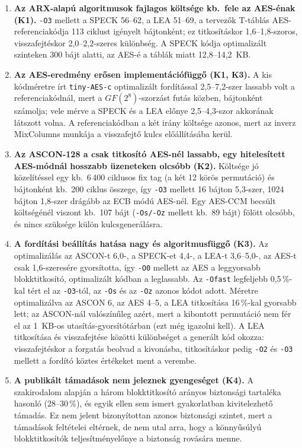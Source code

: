 \documentclass[a4paper,12pt]{report}
\theoremstyle{definition}
\theoremstyle{remark}
\begin{document}
\begin{enumerate}
\item \textbf{Az ARX-alapú algoritmusok fajlagos költsége kb.\ fele az AES-énak (K1).} \texttt{-O3} mellett a SPECK 56--62, a LEA 51--69, a tervezők T-táblás AES-referenciakódja 113 ciklust igényelt bájtonként; ez titkosításkor 1,6--1,8-szoros, visszafejtéskor 2,0--2,2-szeres különbség. A SPECK kódja optimalizált szinteken 300 bájt alatti, az AES-é a táblák miatt 12,8--14,2~KB.

\item \textbf{Az AES-eredmény erősen implementációfüggő (K1, K3).} A kis kódméretre írt \texttt{tiny-AES-c} optimalizált fordítással 2,5--7,2-szer lassabb volt a referenciakódnál, mert a $GF(2^8)$-szorzást futás közben, bájtonként számolja; vele mérve a SPECK és a LEA előnye 2,5--4,3-szor akkorának látszott volna. A referenciakódban a két irány költsége azonos, mert az inverz MixColumns munkája a visszafejtő kulcs előállításába kerül.

\item \textbf{Az ASCON-128 a csak titkosító AES-nél lassabb, egy hitelesített AES-módnál hosszabb üzeneteken olcsóbb (K2).} Költsége jó közelítéssel egy kb.\ 6\,400 ciklusos fix tag (a két 12 körös permutáció) és bájtonként kb.\ 200 ciklus összege, így \texttt{-O3} mellett 16 bájton 5,3-szer, 1024 bájton 1,8-szer drágább az ECB módú AES-nél. Egy AES-CCM becsült költségénél viszont kb.\ 107 bájt (\texttt{-Os/-Oz} mellett kb.\ 89 bájt) fölött olcsóbb, és nincs szüksége külön kulcsgenerálásra.

\item \textbf{A fordítási beállítás hatása nagy és algoritmusfüggő (K3).} Az optimalizálás az ASCON-t 6,0-, a SPECK-et 4,4-, a LEA-t 3,6--5,0-, az AES-t csak 1,6-szeresére gyorsította, így \texttt{-O0} mellett az AES a leggyorsabb blokktitkosító, optimalizált kódban a leglassabb. Az \texttt{-Ofast} legfeljebb 0,5\,\%-kal tért el az \texttt{-O3}-tól, az \texttt{-Os} és az \texttt{-Oz} azonos kódot adott. Méretre optimalizálva az ASCON 6, az AES 4--5, a LEA titkosítása 16\,\%-kal gyorsabb lett; az ASCON-nál valószínűleg azért, mert a kibontott permutáció nem fér el az 1~KB-os utasítás-gyorsítótárban (ezt még igazolni kell). A LEA titkosítása és visszafejtése közötti különbséget a generált kód okozza: visszafejtéskor a forgatás beolvad a kivonásba, titkosításkor pedig \texttt{-O2} és \texttt{-O3} mellett a fordító köztes értékeket ment a verembe.

\item \textbf{A publikált támadások nem jeleznek gyengeséget (K4).} A szakirodalom alapján a három blokktitkosító arányos biztonsági tartaléka hasonló (28--30\,\%), és egyik ellen sem ismert gyakorlatban kivitelezhető támadás. Ez nem jelent bizonyítottan azonos biztonsági szintet, mert a támadások feltételei eltérnek, de nem utal arra, hogy a könnyűsúlyú blokktitkosítók teljesítményelőnye a biztonság rovására menne.
\end{enumerate}
\end{document}
